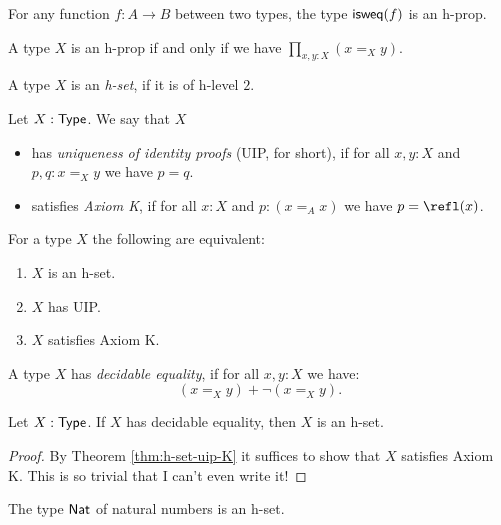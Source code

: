 \begin{cor}
 For any function $f \colon A \to B$ between two types, the type $\mathsf{isweq}(f)$ is an h-prop.
\end{cor}

\begin{thm}
 A type $X$ is an h-prop if and only if we have $\prod\limits_{x, y : X} (x =_X y)$.
\end{thm}

\begin{defn}
 A type $X$ is an {\em h-set}, if it is of h-level $2$.
\end{defn}

\begin{defn}
 Let $X : \mathsf{Type}$. We say that $X$
 \begin{itemize}
  \item has {\em uniqueness of identity proofs} (UIP, for short), if for all $x, y : X$ and $p, q : x =_X y$ we have $p = q$.
  \item satisfies {\em Axiom K}, if for all $x : X$ and $p : (x =_A x)$ we have $p = \refl(x)$.
 \end{itemize}
\end{defn}

\begin{thm}\label{thm:h-set-uip-K}
 For a type $X$ the following are equivalent:
 \begin{enumerate}
  \item $X$ is an h-set.
  \item $X$ has UIP.
  \item $X$ satisfies Axiom K.
 \end{enumerate}
\end{thm}

\begin{defn}
 A type $X$ has {\em decidable equality}, if for all $x, y : X$ we have:
 \[(x =_X y) + \neg (x =_X y).\]
\end{defn}

\begin{thm}
 Let $X : \mathsf{Type}$. If $X$ has decidable equality, then $X$ is an h-set.
\end{thm}

\begin{proof}
 By Theorem \ref{thm:h-set-uip-K} it suffices to show that $X$ satisfies Axiom K. This is so trivial that I can't even write it!
\end{proof}

\begin{thm}\label{prop:nat-is-set}
 The type $\mathsf{Nat}$ of natural numbers is an h-set.
\end{thm}

